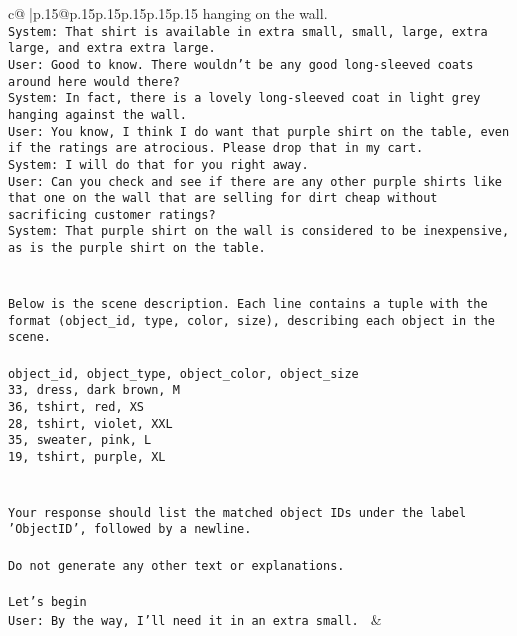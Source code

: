\documentclass{article}
\begin{document}
{\begin{supertabular}{c@{$\;$}|p{.15\linewidth}@{}p{.15\linewidth}p{.15\linewidth}p{.15\linewidth}p{.15\linewidth}p{.15\linewidth}}
{{{hanging on the wall.\\ \tt System: That shirt is available in extra small, small, large, extra large, and extra extra large.\\ \tt User: Good to know. There wouldn't be any good long-sleeved coats around here would there?\\ \tt System: In fact, there is a lovely long-sleeved coat in light grey hanging against the wall.\\ \tt User: You know, I think I do want that purple shirt on the table, even if the ratings are atrocious. Please drop that in my cart.\\ \tt System: I will do that for you right away.\\ \tt User: Can you check and see if there are any other purple shirts like that one on the wall that are selling for dirt cheap without sacrificing customer ratings?\\ \tt System: That purple shirt on the wall is considered to be inexpensive, as is the purple shirt on the table.\\ \tt \\ \tt \\ \tt Below is the scene description. Each line contains a tuple with the format (object_id, type, color, size), describing each object in the scene.\\ \tt \\ \tt object_id, object_type, object_color, object_size\\ \tt 33, dress, dark brown, M\\ \tt 36, tshirt, red, XS\\ \tt 28, tshirt, violet, XXL\\ \tt 35, sweater, pink, L\\ \tt 19, tshirt, purple, XL\\ \tt \\ \tt \\ \tt Your response should list the matched object IDs under the label 'ObjectID', followed by a newline.\\ \tt \\ \tt Do not generate any other text or explanations.\\ \tt \\ \tt Let's begin\\ \tt User: By the way, I'll need it in an extra small. 
	  } 
	   } 
	   } 
	 & \\ 
 

    \theutterance {}  


\end{supertabular}}
\end{document}
